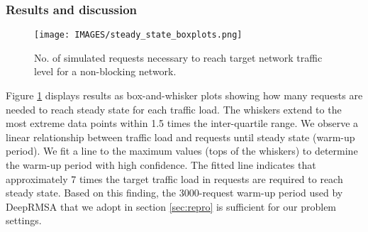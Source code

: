 \subsubsection{Results and discussion}

\begin{figure}
    \centering
    \texttt{[image: IMAGES/steady\_state\_boxplots.png]}
    \caption{No. of simulated requests necessary to reach target network traffic level for a non-blocking network.}
    \label{fig:traffic_warmup}
\end{figure}

Figure \ref{fig:traffic_warmup} displays results as box-and-whisker plots showing how many requests are needed to reach steady state for each traffic load. The whiskers extend to the most extreme data points within 1.5 times the inter-quartile range. We observe a linear relationship between traffic load and requests until steady state (warm-up period). We fit a line to the maximum values (tops of the whiskers) to determine the warm-up period with high confidence. The fitted line indicates that approximately 7 times the target traffic load in requests are required to reach steady state. Based on this finding, the 3000-request warm-up period used by DeepRMSA that we adopt in section \ref{sec:repro} is sufficient for our problem settings.